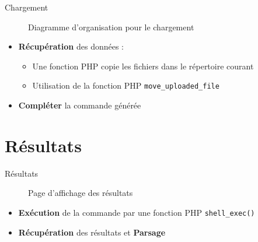 \documentclass{beamer}
\begin{document}
\begin{frame}[fragile]{\textcolor{bleu2}{\hspace{1cm}Chargement}}
	\begin{figure}
		\begin{center}
			\caption{Diagramme d'organisation pour le chargement}
		\end{center}
	\end{figure}
	\begin{itemize}
		\item \textbf{Récupération} des données :
		\begin{itemize}
			\item Une fonction PHP copie les fichiers dans le répertoire courant
			 \item Utilisation de la fonction PHP {\footnotesize\texttt{move\_uploaded\_file}}
		\end{itemize}
		\item \textbf{Compléter} la commande générée
	\end{itemize}
\end{frame}

\section{Résultats}

\begin{frame}{\textcolor{bleu2}{\hspace{1cm} Résultats}}
	\begin{figure}
		\begin{center}
			\caption{Page d'affichage des résultats}
		\end{center}
	\end{figure}
	\begin{itemize}
		\item \textbf{Exécution} de la commande par une fonction PHP {\footnotesize \texttt{shell\_exec()}}
		\item \textbf{Récupération} des résultats et \textbf{Parsage}
	\end{itemize}
\end{frame}
\end{document}
